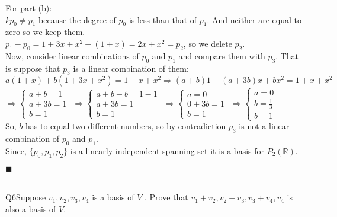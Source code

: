 \documentclass{article}
\begin{document}
For part (b):\\
$kp_0 \neq p_1$ because the degree of $p_0$ is less than that of
$p_1$. And neither are equal to zero so we keep them.\\
$p_1-p_0=  1+3x+x^2 -(1+x) = 2x+x^2 = p_2$, so we delete $p_2$.\\
Now, consider linear combinations of $p_0$ and $p_1$ and compare them
with $p_3$. That is suppose that $p_3$ is a linear combination of them:\\
$a(1+x)+b(1+3x+x^2)=1+x+x^2 \Rightarrow (a+b)1 +(a+3b)x +bx^2 =
1+x+x^2$\\
$\Rightarrow \begin{cases} a+b=1 \\ a+3b =1 \\ b=1 \end{cases}$
$\Rightarrow \begin{cases} a+b-b=1-1 \\ a+3b =1\\ b=1 \end{cases}$
$\Rightarrow \begin{cases} a=0 \\ 0+3b =1 \\ b=1 \end{cases}$
$\Rightarrow \begin{cases} a=0 \\ b =\frac{1}{3} \\ b=1 \end{cases}$\\
So, $b$ has to equal two different numbers, so by contradiction $p_3$
is not a linear combination of $p_0$ and $p_1$.\\ Since,
$\{p_0,p_1,p_2\}$ is a linearly independent spanning set it is a basis
for $P_2(\mathbb{R}).$\\
\begin{flushright}$\blacksquare$\end{flushright}\\

\newpage
Q6\quad Suppose $v_1 , v_2 , v_3 , v_4$ is a basis of $V$ . Prove that
$v_1 + v_2 , v_2 + v_3 , v_3 + v_4 , v_4$
is also a basis of $V$.\\

\vspace{1.618cm}
\end{document}
